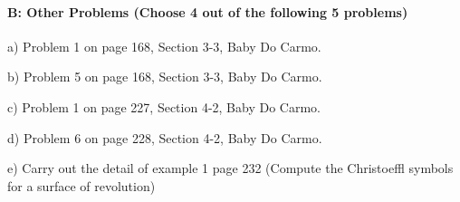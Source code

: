 \documentclass[12pt]{article}
\begin{document}
\paragraph{B: Other Problems (Choose 4 out of the following 5 problems)}
\begin{itemize}

{\item a) Problem 1 on page 168,  Section 3-3, Baby Do Carmo.}
{\item b) Problem 5 on page 168,  Section 3-3, Baby Do Carmo.}
{\item c) Problem 1 on page 227,  Section 4-2, Baby Do Carmo.}
{\item d) Problem 6 on page 228,  Section 4-2, Baby Do Carmo.}
{\item e) Carry out the detail of example 1 page 232 (Compute the Christoeffl symbols for a surface of revolution)}

\end{itemize}

\end{document}
